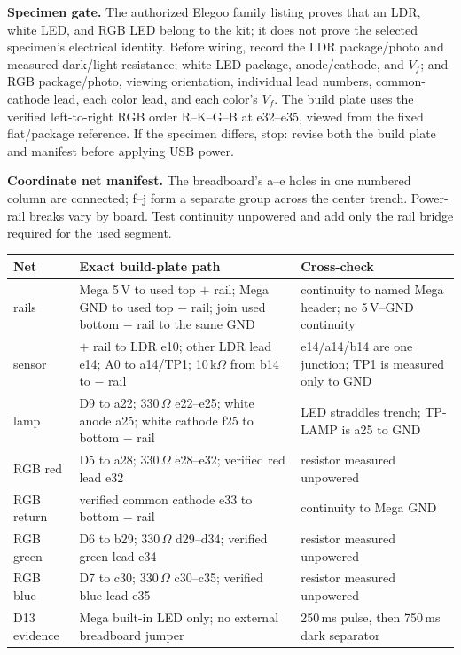 \documentclass[11pt]{article}
\begin{document}
\textbf{Specimen gate.} The authorized Elegoo family listing proves that an
LDR, white LED, and RGB LED belong to the kit; it does not prove the selected
specimen's electrical identity. Before wiring, record the LDR package/photo and
measured dark/light resistance; white LED package, anode/cathode, and
\(V_f\); and RGB package/photo, viewing orientation, individual lead numbers,
common-cathode lead, each color lead, and each color's \(V_f\). The build plate
uses the verified left-to-right RGB order R--K--G--B at e32--e35, viewed from
the fixed flat/package reference. If the specimen differs,
stop: revise both the build plate and manifest before applying USB power.

\textbf{Coordinate net manifest.} The breadboard's a--e holes in one numbered
column are connected; f--j form a separate group across the center trench.
Power-rail breaks vary by board. Test continuity unpowered and add only the
rail bridge required for the used segment.

\begin{tabularx}{\linewidth}{@{}l X X@{}}
\toprule
Net & Exact build-plate path & Cross-check\\
\midrule
rails & Mega 5\,V to used top \(+\) rail; Mega GND to used top \(-\)
      rail; join used bottom \(-\) rail to the same GND & continuity to named
      Mega header; no 5\,V--GND continuity\\
sensor & \(+\) rail to LDR e10; other LDR lead e14; A0 to a14/TP1;
       10\,k\(\Omega\) from b14 to \(-\) rail & e14/a14/b14 are one junction;
       TP1 is measured only to GND\\
lamp & D9 to a22; 330\,\(\Omega\) e22--e25; white anode a25;
       white cathode f25 to bottom \(-\) rail & LED straddles trench; TP-LAMP
       is a25 to GND\\
RGB red & D5 to a28; 330\,\(\Omega\) e28--e32; verified red lead e32 &
       resistor measured unpowered\\
RGB return & verified common cathode e33 to bottom \(-\) rail & continuity to
       Mega GND\\
RGB green & D6 to b29; 330\,\(\Omega\) d29--d34; verified green lead e34 &
       resistor measured unpowered\\
RGB blue & D7 to c30; 330\,\(\Omega\) c30--c35; verified blue lead e35 &
       resistor measured unpowered\\
D13 evidence & Mega built-in LED only; no external breadboard jumper &
       250\,ms pulse, then 750\,ms dark separator\\
\bottomrule
\end{tabularx}
\end{document}
